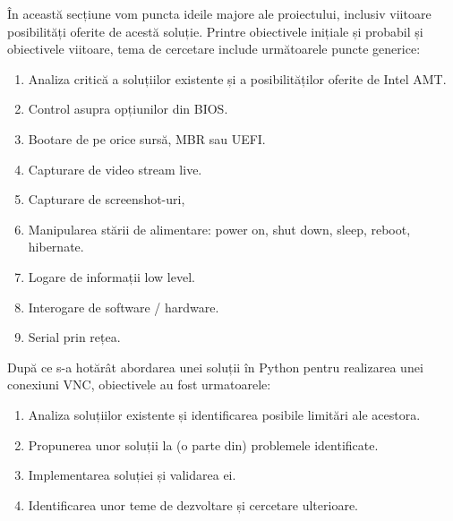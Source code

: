 
În această secțiune vom puncta ideile majore ale proiectului, inclusiv viitoare posibilități oferite de acestă soluție.
Printre obiectivele inițiale și probabil și obiectivele viitoare, tema de cercetare include următoarele puncte generice:
\begin{enumerate}
  \item Analiza critică a soluțiilor existente și a posibilităților oferite de Intel AMT.
  \item Control asupra opțiunilor din BIOS.
  \item Bootare de pe orice sursă, MBR sau UEFI.
  \item Capturare de video stream live.
  \item Capturare de screenshot-uri,
  \item Manipularea stării de alimentare: power on, shut down, sleep, reboot, hibernate.
  \item Logare de informații low level.
  \item Interogare de software / hardware.
  \item Serial prin rețea.
\end{enumerate}

După ce s-a hotărât abordarea unei soluții în Python pentru realizarea unei conexiuni VNC, obiectivele au fost urmatoarele:
\begin{enumerate}
  \item Analiza soluțiilor existente și identificarea posibile limitări ale acestora.
  \item Propunerea unor soluții la (o parte din) problemele identificate. 
  \item Implementarea soluției și validarea ei.
  \item Identificarea unor teme de dezvoltare și cercetare ulterioare.
\end{enumerate}


